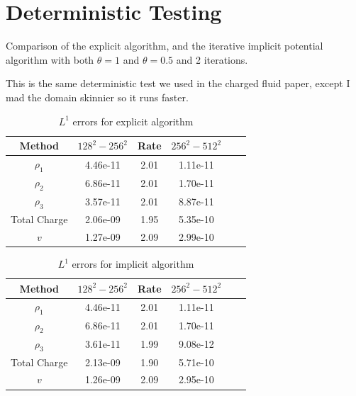 \documentclass[final]{siamltex}
\begin{document}
\section{Deterministic Testing}
Comparison of the explicit algorithm, and the iterative implicit
potential algorithm with both $\theta=1$ and $\theta=0.5$ and 2 iterations.

This is the same deterministic test we used in the charged fluid paper, except
I mad the domain skinnier so it runs faster.

\begin{table}[htb]
\begin{center}
\caption{$L^1$ errors for explicit algorithm}
\label{tab:explicit convergence}
\begin{tabular}{cccccc}
\\ \hline\hline                                                                 
Method & $128^2-256^2$ & Rate & $256^2-512^2$ \\
\hline\hline
$\rho_1$     & 4.46e-11 & 2.01 & 1.11e-11 \\
$\rho_2$     & 6.86e-11 & 2.01 & 1.70e-11 \\
$\rho_3$     & 3.57e-11 & 2.01 & 8.87e-11 \\
Total Charge & 2.06e-09 & 1.95 & 5.35e-10 \\
$v$          & 1.27e-09 & 2.09 & 2.99e-10 \\
\end{tabular}
\end{center}
\end{table}

\begin{table}[htb]
\begin{center}
\caption{$L^1$ errors for implicit algorithm}
\label{tab:implicit convergence}
\begin{tabular}{cccccc}
\\ \hline\hline                                                                 
Method & $128^2-256^2$ & Rate & $256^2-512^2$ \\
\hline\hline
$\rho_1$     & 4.46e-11 & 2.01 & 1.11e-11 \\
$\rho_2$     & 6.86e-11 & 2.01 & 1.70e-11 \\
$\rho_3$     & 3.61e-11 & 1.99 & 9.08e-12 \\
Total Charge & 2.13e-09 & 1.90 & 5.71e-10 \\
$v$          & 1.26e-09 & 2.09 & 2.95e-10 \\
\end{tabular}
\end{center}
\end{table}
\end{document}
